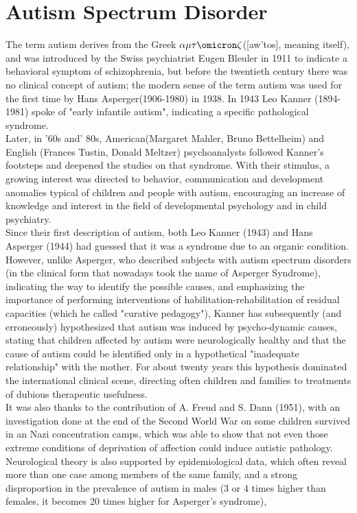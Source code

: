 \section{Autism Spectrum Disorder}
The term autism derives from the Greek $\alpha\mu\tau\omicron\zeta$([aw'tos], meaning itself), and was introduced by the Swiss psychiatrist Eugen Bleuler in 1911 to indicate a behavioral symptom of schizophrenia, but before the twentieth century there was no clinical concept of autism; the modern sense of the term autism was used for the first time by Hans Asperger(1906-1980) in 1938. In 1943 Leo Kanner (1894-1981) spoke of "early infantile autism", indicating a specific pathological syndrome.\\
Later, in '60s and' 80s, American(Margaret Mahler, Bruno Bettelheim) and English (Frances Tustin, Donald Meltzer) psychoanalysts followed Kanner's footsteps and deepened the studies on that syndrome. With their stimulus, a growing interest was directed to behavior, communication and development anomalies typical of children and people with autism, encouraging an increase of knowledge and interest in the field of developmental psychology and in child psychiatry.\\
Since their first description of autism, both Leo Kanner (1943) and Hans Asperger (1944) had guessed that it was a syndrome due to an organic condition. However, unlike Asperger, who described subjects with autism spectrum disorders (in the clinical form that nowadays took the name of Asperger Syndrome), indicating the way to identify the possible causes, and emphasizing the importance of performing interventions of habilitation-rehabilitation of residual capacities (which he called "curative pedagogy"), Kanner has subsequently (and erroneously) hypothesized that autism was induced by psycho-dynamic causes, stating that children affected by autism were neurologically healthy and that the cause of autism could be identified only in a hypothetical "inadequate relationship" with the mother. For about twenty years this hypothesis dominated the international clinical scene, directing often children and families to treatments of dubious therapeutic usefulness.\\
It was also thanks to the contribution of A. Freud and S. Dann (1951), with an investigation done at the end of the Second World War on some children survived in an Nazi concentration camps, which was able to show that not even those extreme conditions of deprivation of affection could induce autistic pathology. Neurological theory is also supported by epidemiological data, which often reveal more than one case among members of the same family, and a strong disproportion in the prevalence of autism in males (3 or 4 times higher than females, it becomes 20 times higher for Asperger's syndrome),
